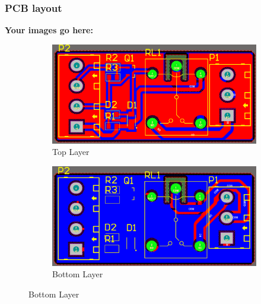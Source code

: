 \subsubsection{PCB layout}
\textbf{Your images go here:}
\begin{figure}[h!]
    \centering
    \begin{subfigure}{0.495\textwidth}
        \centering
        \includegraphics[width=\textwidth]{graphics/ex2/f7.png}
        \caption*{Top Layer}
    \end{subfigure}
    \hfill
    \begin{subfigure}{0.495\textwidth}
        \centering
        \includegraphics[width=\textwidth]{graphics/ex2/f8.png}
        \caption*{Bottom Layer}
    \end{subfigure}
\end{figure}

